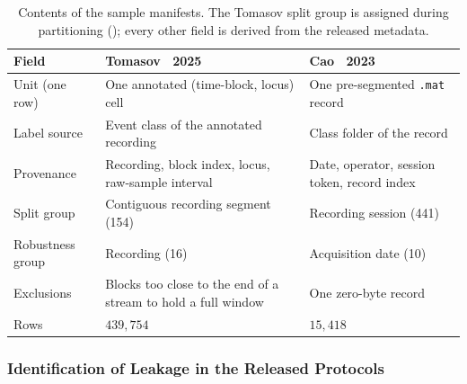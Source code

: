 \begin{table}[!htbp]
	\centering
	\caption{Contents of the sample manifests. The Tomasov split group is assigned during partitioning (); every other field is derived from the released metadata.}
	\label{tab:manifest}
	\small
	\setlength{\tabcolsep}{4pt}
	\begin{tabularx}{\textwidth}{@{}>{\raggedright\arraybackslash}p{2.7cm} >{\raggedright\arraybackslash}X >{\raggedright\arraybackslash}X@{}}
		\toprule
		\textbf{Field} & \textbf{Tomasov \etal\ 2025} & \textbf{Cao \etal\ 2023}\\
		\midrule
		Unit (one row)   & One annotated (time-block, locus) cell & One pre-segmented \texttt{.mat} record\\
		Label source     & Event class of the annotated recording & Class folder of the record\\
		Provenance       & Recording, block index, locus, raw-sample interval & Date, operator, session token, record index\\
		Split group      & Contiguous recording segment (154) & Recording session (441)\\
		Robustness group & Recording (16) & Acquisition date (10)\\
		Exclusions       & Blocks too close to the end of a stream to hold a full window & One zero-byte record\\
		Rows             & $439{,}754$ & $15{,}418$\\
		\bottomrule
	\end{tabularx}
\end{table}

\subsubsection{Identification of Leakage in the Released Protocols}
\label{sec:chap3LeakageAudit}

